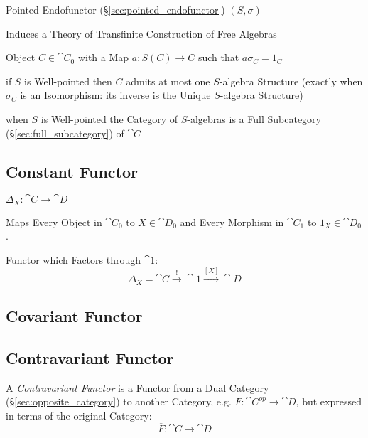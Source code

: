 Pointed Endofunctor (\S\ref{sec:pointed_endofunctor}) $(S, \sigma)$

Induces a Theory of Transfinite Construction of Free Algebras

Object $C \in \cat{C}_0$ with a Map $a : S(C) \rightarrow C$ such that
$a \sigma_C = 1_C$

if $S$ is Well-pointed then $C$ admits at most one $S$-algebra
Structure (exactly when $\sigma_C$ is an Isomorphism: its inverse is
the Unique $S$-algebra Structure)

when $S$ is Well-pointed the Category of $S$-algebras is a Full
Subcategory (\S\ref{sec:full_subcategory}) of $\cat{C}$



\subsection{Constant Functor}\label{sec:constant_functor}

$\Delta_X : \cat{C} \rightarrow \cat{D}$

Maps Every Object in $\cat{C}_0$ to $X \in \cat{D}_0$ and Every
Morphism in $\cat{C}_1$ to $1_X \in \cat{D}_0$.

Functor which Factors through $\cat{1}$:
\[
  \Delta_X = \cat{C} \xrightarrow{\;\;!\;\;} \cat{1}
    \xrightarrow{[X]} \cat{D}
\]



\subsection{Covariant Functor} \label{sec:covariant_functor}

\subsection{Contravariant Functor} \label{sec:contravariant_functor}

A \emph{Contravariant Functor} is a Functor from a Dual Category
(\S\ref{sec:opposite_category}) to another Category, e.g. $F :
\cat{C^{op}} \rightarrow \cat{D}$, but expressed in terms of the
original Category:
\[
  \overline{F} : \cat{C} \rightarrow \cat{D}
\]

